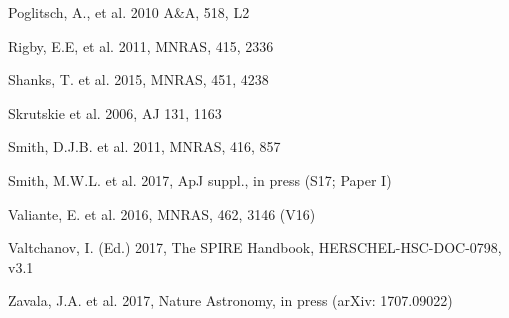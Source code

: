 \documentclass[a4paper,fleqn,usenatbib, twocolumn]{aastex61}
\begin{document}
\begin{thebibliography}{}
 Poglitsch, A., et al. 2010 A\&A, 518, L2

 Rigby, E.E, et al. 2011, MNRAS, 415, 2336 

 Shanks, T. et al. 2015, MNRAS, 451, 4238

 Skrutskie et al. 2006, AJ 131, 1163
  
 Smith, D.J.B. et al. 2011, MNRAS, 
416, 857

 Smith, M.W.L. et al. 2017, ApJ suppl., in press
(S17; Paper I)

 Valiante, E. et al. 2016, MNRAS, 462, 3146
(V16)

 Valtchanov, I. (Ed.) 2017, The SPIRE Handbook, HERSCHEL-HSC-DOC-0798, v3.1 

 Zavala, J.A. et al. 2017, Nature Astronomy,
in press (arXiv: 1707.09022)

\end{thebibliography}



\label{lastpage}
\end{document}
